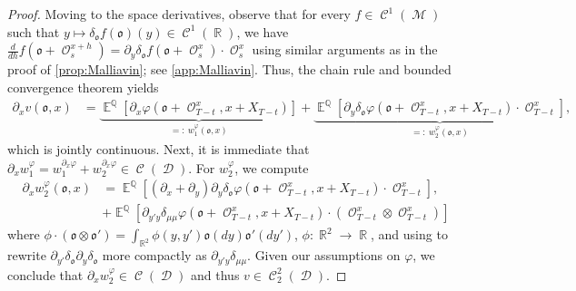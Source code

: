 \documentclass[11pt]{article}
\def\mo{\mathfrak{o}}
\theoremstyle{plain}
\theoremstyle{definition}
\DeclareMathOperator{\E}{\mathbb{E}}
\DeclareMathOperator{\Q}{\mathbb{Q}}
\DeclareMathOperator{\R}{\mathbb{R}}
\DeclareMathOperator{\calC}{\mathcal{C}}
\DeclareMathOperator{\calD}{\mathcal{D}}
\DeclareMathOperator{\calM}{\mathcal{M}}
\DeclareMathOperator{\calO}{\mathcal{O}}
\begin{document}
\begin{proof}
Moving to the space derivatives, observe that  for every $f\in \calC^1(\calM)$ such that $y\mapsto \delta_\mo f(\mo)(y) \in \calC^1(\R)$, we have 
$\frac{d}{dh} f(\mo+\calO_{s}^{x+h}) = \partial_y \delta_\mo f(\mo+\calO_{s}^{x})\cdot \calO_{s}^{x}$ 
using similar arguments as in the proof of \cref{prop:Malliavin};  see \cref{app:Malliavin}. Thus, the chain rule and bounded convergence theorem yields 
\begin{align*}
     \partial_x v(\mo,x) &= \underbrace{\E^{\Q}[\partial_x\varphi(\mo+\calO_{T-t}^{x},x+X_{T-t})]}_{=: \ w_1^{\varphi}(\mo,x)} + \underbrace{\E^{\Q}[\partial_y \delta_\mo\varphi(\mo+\calO_{T-t}^{x},x+X_{T-t}) \cdot \calO_{T-t}^{x}]}_{=: \ w_2^{\varphi}(\mo,x)},
\end{align*}
which is jointly continuous.  
Next, it is immediate that $\partial_x w_1^{\varphi} = w_1^{\partial_x\varphi}+ w_2^{\partial_x\varphi} \in \calC(\calD)$. For $w_2^{\varphi}$, we compute 
\begin{align*}
   \partial_x w_2^{\varphi}(\mo,x) &=
     \E^{\Q}[(\partial_{x}+ \partial_{y})\partial_{y}\delta_\mo\varphi(\mo+\calO_{T-t}^{x},x+X_{T-t})\cdot \calO_{T-t}^{x}],\\[0.5em]
     &+     \E^{\Q}[\partial_{y'y} \delta_{\mu \mu} \varphi (\mo+\calO_{T-t}^{x},x+X_{T-t}) \cdot (\calO_{T-t}^{x} \otimes \calO_{T-t}^{x}) ] 
\end{align*}
where $\phi \cdot (\mo \otimes \mo' ) = \int_{\R^2} \phi(y,y')\mo(dy)\mo'(dy')$, $\phi:\R^2\to \R$,  
and 
using \cite[Lemma 2.2.4.]{CardDelLasLio}  to rewrite $\partial_{y'}\delta_\mo\partial_{y}\delta_\mo$ more compactly as $\partial_{y'y} \delta_{\mu \mu}$. Given our assumptions on $\varphi$, we  conclude that $ \partial_x w_2^{\varphi}\in\calC(\calD)$ and thus   $v\in\calC^{2}_2(\calD)$. 
 \end{proof}


\end{document}
